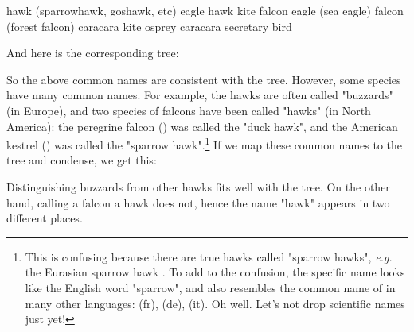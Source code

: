 \starttabulate[|l|l|]
  \NC\NR
\NC {} \NC hawk (sparrowhawk, goshawk, etc)\NC\NR
\NC {} \NC eagle  \NC\NR
\NC {} \NC hawk \NC\NR
\NC {} \NC kite \NC\NR
\NC {} \NC falcon \NC\NR
\NC {} \NC eagle (sea eagle) \NC\NR
\NC {} \NC falcon (forest falcon)\NC\NR
\NC {} \NC caracara \NC\NR
\NC {} \NC kite \NC\NR
\NC {} \NC osprey \NC\NR
\NC {} \NC caracara \NC\NR
\NC {} \NC secretary bird
\stoptabulate

And here is the corresponding tree:


So the above common names are consistent with the tree. However, some species
have many common names. For example, the  hawks are often called
"buzzards" (in Europe), and two species of falcons have been called "hawks" (in
North America): the peregrine falcon () was called the
"duck hawk", and the American kestrel () was called
the "sparrow hawk".\footnote{This is confusing because there are true hawks
called "sparrow hawks", {\em e.g.} the Eurasian sparrow hawk . To add to the confusion, the specific name  looks
like the English word "sparrow", and also resembles the common name of
 in many other languages:  (fr),
 (de),  (it).  Oh well. Let's not drop
scientific names just yet!} If we map these common names to the tree and
condense, we get this:


Distinguishing buzzards from other hawks fits well with the tree. On
the other hand, calling a falcon a hawk does not, hence the name "hawk" appears
in two different places.
